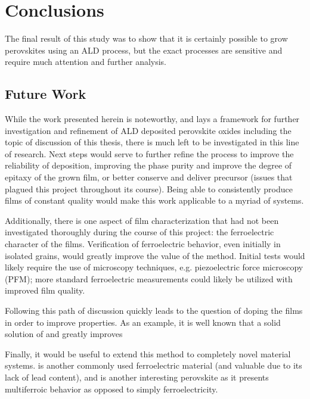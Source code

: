 \chapter{Conclusions}
\label{ch:Conc}
\thispagestyle{empty}


The final result of this study was to show that it is certainly possible to grow perovskites using an ALD process, but the exact processes are sensitive and require much attention and further analysis. 



\section{Future Work}
\label{sec:Conc-Future}

While the work presented herein is noteworthy, and lays a framework for further investigation and refinement of ALD deposited perovskite oxides including the topic of discussion of this thesis, there is much left to be investigated in this line of research. Next steps would serve to further refine the process to improve the reliability of deposition, improving the phase purity and improve the degree of epitaxy of the grown film, or better conserve and deliver precursor (issues that plagued this project throughout its course). Being able to consistently produce films of constant quality would make this work applicable to a myriad of systems. 

Additionally, there is one aspect of film characterization that had not been investigated thoroughly during the course of this project: the ferroelectric character of the films. Verification of ferroelectric behavior, even initially in isolated grains, would greatly improve the value of the method. Initial tests would likely require the use of microscopy techniques, e.g. piezoelectric force microscopy (PFM); more standard ferroelectric measurements could likely be utilized with improved film quality. 

Following this path of discussion quickly leads to the question of doping the films in order to improve properties. As an example, it is well known  that a solid solution of  and  greatly improves  

Finally, it would be useful to extend this method to completely novel material systems.  is another commonly used ferroelectric material (and valuable due to its lack of lead content), and  is another interesting perovskite as it presents multiferroic behavior as opposed to simply ferroelectricity. 






